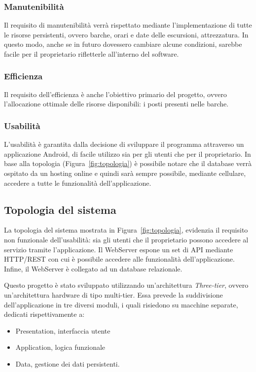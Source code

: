 \subsubsection{Manutenibilità}
Il requisito di manutenibilità verrà rispettato mediante l'implementazione di tutte le risorse persistenti, ovvero barche, orari e date delle escursioni, attrezzatura. In questo modo, anche se in futuro dovessero cambiare alcune condizioni, sarebbe facile per il proprietario rifletterle all'interno del software.
\subsubsection{Efficienza}
Il requisito dell'efficienza è anche l'obiettivo primario del progetto, ovvero l'allocazione ottimale delle risorse disponibili: i posti presenti nelle barche.
\subsubsection{Usabilità}
L'usabilità è garantita dalla decisione di sviluppare il programma attraverso un applicazione Android, di facile utilizzo sia per gli utenti che per il proprietario. In base alla topologia (Figura~\ref{fig:topologia}) è possibile notare che il database verrà ospitato da un hosting online e quindi sarà sempre possibile, mediante cellulare, accedere a tutte le funzionalità dell'applicazione.

\newpage

\subsection{Topologia del sistema}
La topologia del sistema mostrata in Figura~\ref{fig:topologia}, evidenzia il requisito non funzionale dell'usabilità: sia gli utenti che il proprietario possono accedere al servizio tramite l'applicazione. Il WebServer espone un set di API mediante HTTP/REST con cui è possibile accedere alle funzionalità dell'applicazione. Infine, il WebServer è collegato ad un database relazionale.

Questo progetto è stato sviluppato utilizzando un’architettura \textit{Three-tier}, ovvero un’architettura hardware di tipo multi-tier. Essa prevede la suddivisione dell’applicazione in tre diversi moduli, i quali risiedono su macchine separate, dedicati rispettivamente a:
\begin{itemize}
    \item Presentation, interfaccia utente
    \item Application, logica funzionale
    \item Data, gestione dei dati persistenti.
\end{itemize}

